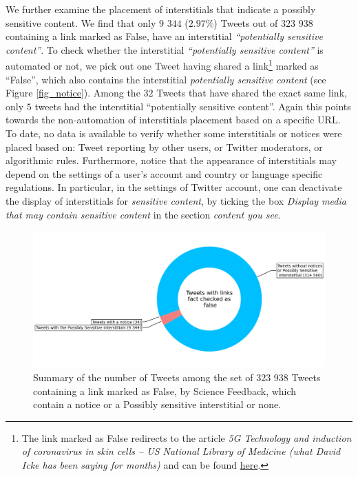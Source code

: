 \documentclass{article}
\begin{document}
We further examine the placement of interstitials that indicate a possibly sensitive content. We find that only $9$ $344$ ($2.97\%$) Tweets out of $323$ $938$ containing a link marked as False, have an interstitial {\it ``potentially sensitive content''}. To check whether the interstitial {\it ``potentially sensitive content''} is automated or not, we pick out one Tweet having shared a link\footnote{The link marked as False redirects to the article {\it 5G Technology and induction of coronavirus in skin cells – US National Library of Medicine (what David Icke has been saying for months) } and can be found \href{https://davidicke.com/2020/07/22/5g-technology-and-induction-of-coronavirus-in-skin-cells-us-national-library-of-medicine-what-david-icke-has-been-saying-for-months/}{here}.} marked as ``False'', which also contains the interstitial {\it potentially sensitive content} (see Figure \ref{fig_notice}). Among the $32$ Tweets that have shared the exact same link, only $5$ tweets had the interstitial ``potentially sensitive content''. Again this points towards the non-automation of interstitials placement based on a specific URL. To date, no data is available to verify whether some interstitials or notices were placed based on: Tweet reporting by other users, or Twitter moderators, or algorithmic rules. Furthermore, notice that the appearance of interstitials may depend on the settings of a user's account and country or language specific regulations. In particular, in the settings of Twitter account, one can deactivate the display of interstitials for {\it sensitive content}, by ticking the box {\it Display media that may contain sensitive content} in the section {\it content you see}. 

\begin{figure}[h]
	\centering
	\includegraphics[scale=0.5]{../figure/donut_twitter.png}
	\caption{Summary of the number of Tweets among the set of $323$ $938$ Tweets containing a link marked as False, by Science Feedback, which contain a notice or a Possibly sensitive interstitial or none.}
\label{flags_tab}
\end{figure}
\end{document}
